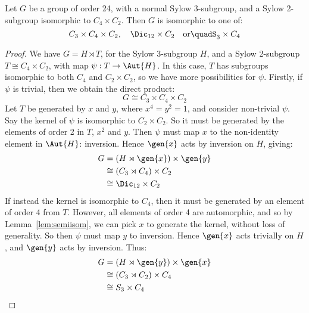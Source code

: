 \begin{lemma}
    Let \(G\) be a group of order 24, with a normal Sylow 3-subgroup, and a Sylow 2-subgroup isomorphic to \(C_{4}
    \times C_2\).
    Then \(G\) is isomorphic to one of:
    \[
        C_3 \times C_4 \times C_2, \quad%
        \Dic_{12} \times C_2 \quad \text{or} \quad%
        S_3 \times C_4%
    \]
\end{lemma}

\begin{proof}
    We have \(G = H \rtimes T\), for the Sylow 3-subgroup \(H\), and a Sylow 2-subgroup \(T \cong C_4 \times C_2\), with
    map \(\psi:T \to \Aut{H}\).
    In this case, \(T\) has subgroups isomorphic to both \(C_4\) and \(C_2 \times C_2\), so we have more
    possibilities for \(\psi\).
    Firstly, if \(\psi\) is trivial, then we obtain the direct product:
    \[G \cong C_3 \times C_4 \times C_2\]
    Let \(T\) be generated by \(x\) and \(y\), where \(x^4 = y^2 = 1\), and consider non-trivial \(\psi\).
    Say the kernel of \(\psi\) is isomorphic to \(C_2 \times C_2\).
    So it must be generated by the elements of order 2 in \(T\), \(x^2\) and \(y\).
    Then \(\psi\) must map \(x\) to the non-identity element in \(\Aut{H}\): inversion.
    Hence \(\gen{x}\) acts by inversion on \(H\), giving:
    \begin{equation*}
    \begin{aligned}
        G &= (H \rtimes \gen{x}) \times \gen{y} \\
        &\cong (C_3 \rtimes C_4) \times C_2 \\
        &\cong \Dic_{12} \times C_2
    \end{aligned}
    \end{equation*}
    If instead the kernel is isomorphic to \(C_4\), then it must be generated by an element of order 4 from \(T\).
    However, all elements of order 4 are automorphic, and so by Lemma~\ref{lem:semiisom}, we can pick \(x\) to
    generate the kernel, without loss of generality.
    So then \(\psi\) must map \(y\) to inversion.
    Hence \(\gen{x}\) acts trivially on \(H\), and \(\gen{y}\) acts by inversion.
    Thus:
    \begin{equation*}
    \begin{aligned}
        G &= (H \rtimes \gen{y}) \times \gen{x} \\
        &\cong (C_3 \rtimes C_2) \times C_4 \\
        &\cong S_3 \times C_4
    \end{aligned}
    \end{equation*}
\end{proof}

